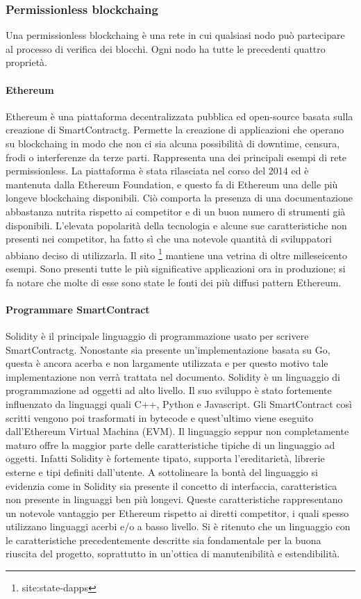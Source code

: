 \subsubsection{Permissionless blockchaing}
Una permissionless \gls{blockchaing} è una rete in cui qualsiasi nodo può partecipare al processo di verifica dei blocchi. Ogni nodo ha tutte le precedenti quattro proprietà.

\paragraph{Ethereum}
Ethereum è una piattaforma decentralizzata pubblica ed open-source basata sulla creazione di \gls{SmartContractg}. Permette la creazione di applicazioni che operano su \gls{blockchaing} in modo che non ci sia alcuna possibilità di downtime, censura, frodi o interferenze da terze parti. Rappresenta una dei principali esempi di rete permissionless.
La piattaforma è stata rilasciata nel corso del 2014 ed è mantenuta dalla Ethereum Foundation, e questo fa di Ethereum una delle più longeve \gls{blockchaing} disponibili. Ciò comporta la presenza di una documentazione abbastanza nutrita rispetto ai competitor e di un buon numero di strumenti già disponibili. 
L’elevata popolarità della tecnologia e alcune sue caratteristiche non presenti nei competitor, ha fatto sì che una notevole quantità di sviluppatori abbiano deciso di utilizzarla. Il sito \footnote{site:state-dapps} mantiene una vetrina di oltre milleseicento esempi. Sono presenti tutte le più significative applicazioni ora in produzione; si fa notare che molte di esse sono state le fonti dei più diffusi pattern Ethereum.

\paragraph{Programmare SmartContract}
Solidity è il principale linguaggio di programmazione usato per scrivere \gls{SmartContractg}. Nonostante sia presente un’implementazione basata su Go, questa è ancora acerba e non largamente utilizzata e per questo motivo tale implementazione non verrà trattata nel documento.
Solidity è un linguaggio di programmazione ad oggetti ad alto livello. Il suo sviluppo è stato fortemente influenzato da linguaggi quali C++, Python e Javascript. Gli SmartContract così scritti vengono poi trasformati in bytecode e quest’ultimo viene eseguito dall’Ethereum Virtual Machina (EVM).
Il linguaggio seppur non completamente maturo offre la maggior parte delle caratteristiche tipiche di un linguaggio ad oggetti. Infatti Solidity è fortemente tipato, supporta l’ereditarietà, librerie esterne e tipi definiti dall’utente. A sottolineare la bontà del linguaggio si evidenzia come in Solidity sia presente il concetto di interfaccia, caratteristica non presente in linguaggi ben più longevi. 
Queste caratteristiche rappresentano un notevole vantaggio per Ethereum rispetto ai diretti competitor, i quali spesso utilizzano linguaggi acerbi e/o a basso livello. Si è ritenuto che un linguaggio con le caratteristiche precedentemente descritte sia fondamentale per la buona riuscita del progetto, soprattutto in un’ottica di manutenibilità e estendibilità.
